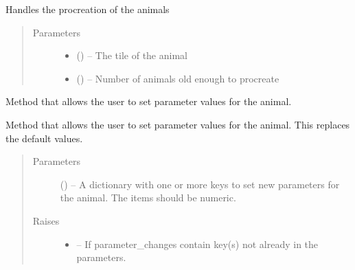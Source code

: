 \documentclass[a4paper,10pt,english]{sphinxmanual}
\begin{document}
\begin{fulllineitems}
\begin{fulllineitems}
\end{fulllineitems}


\begin{fulllineitems}
\label{\detokenize{animals:biosim.animals.Herbivore.procreation}}
Handles the procreation of the animals
\begin{quote}\begin{description}
\item[{Parameters}] \leavevmode\begin{itemize}
\item {} 
 () -- The tile of the animal

\item {} 
 () -- Number of animals old enough to procreate

\end{itemize}

\end{description}\end{quote}

\end{fulllineitems}


\begin{fulllineitems}
\label{\detokenize{animals:biosim.animals.Herbivore.set_parameters}}
Method that allows the user to set parameter values for the animal.

Method that allows the user to set parameter values for the animal.
This replaces the default values.
\begin{quote}\begin{description}
\item[{Parameters}] \leavevmode
{} () -- A dictionary with one or more keys to set new parameters for the
animal. The items should be numeric.

\item[{Raises}] \leavevmode\begin{itemize}
\item {} 
 -- If parameter\_changes contain key(s) not already in the parameters.


\end{itemize}
\end{description}
\end{quote}
\end{fulllineitems}
\end{fulllineitems}
\end{document}
